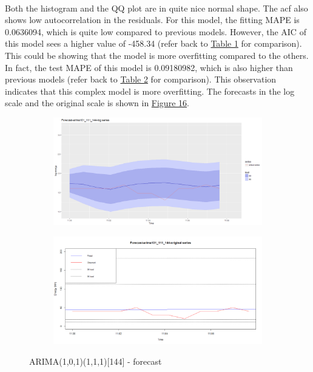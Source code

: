 \documentclass[12pt]{article}
\begin{document}
\paragraph{}
Both the histogram and the QQ plot are in quite nice normal shape. The acf also shows low autocorrelation in the residuals. For this model, the fitting MAPE is 0.0636094, which is quite low compared to previous models. However, the AIC of this model sees a higher value of -458.34 (refer back to \href{table1}{Table 1} for comparison). This could be showing that the model is more overfitting compared to the others. In fact, the test MAPE of this model is 0.09180982, which is also higher than previous models (refer back to \href{table2}{Table 2} for comparison). This observation indicates that this complex model is more overfitting. The forecasts in the log scale and the original scale is shown in \href{figure16}{Figure 16}.
\begin{figure}[H]
  \centering
  \begin{subfigure}[b]{1\linewidth}
    \includegraphics[width=\linewidth]{figure15-5.png}
  \end{subfigure}
  \begin{subfigure}[b]{1\linewidth}
    \includegraphics[width=\linewidth]{figure15-6.png}
  \end{subfigure}
  \caption{ARIMA(1,0,1)(1,1,1)[144] - forecast}
  \label{fig:figure16}
\end{figure}
\end{document}
